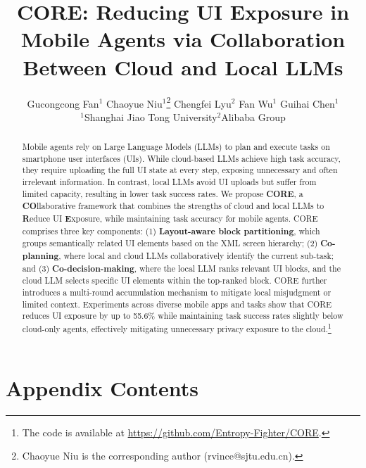\documentclass{article}
\title{CORE: Reducing UI Exposure in Mobile Agents via Collaboration Between Cloud and Local LLMs}
\author{
 Gucongcong Fan$^1$ \quad Chaoyue Niu$^1$\thanks{Chaoyue Niu is the corresponding author (rvince@sjtu.edu.cn).} \quad Chengfei Lyu$^2$ \quad Fan Wu$^1$ \quad Guihai Chen$^1$\\ 
 $^1$Shanghai Jiao Tong University\quad $^2$Alibaba Group
}
\begin{document}
\maketitle


\begin{abstract}
Mobile agents rely on Large Language Models (LLMs) to plan and execute tasks on smartphone user interfaces (UIs). While cloud-based LLMs achieve high task accuracy, they require uploading the full UI state at every step, exposing unnecessary and often irrelevant information. In contrast, local LLMs avoid UI uploads but suffer from limited capacity, resulting in lower task success rates. We propose \textbf{CORE}, a \textbf{CO}llaborative framework that combines the strengths of cloud and local LLMs to \textbf{R}educe UI \textbf{E}xposure, while maintaining task accuracy for mobile agents. CORE comprises three key components: (1) \textbf{Layout-aware block partitioning}, which groups semantically related UI elements based on the XML screen hierarchy; (2) \textbf{Co-planning}, where local and cloud LLMs collaboratively identify the current sub-task; and (3) \textbf{Co-decision-making}, where the local LLM ranks relevant UI blocks, and the cloud LLM selects specific UI elements within the top-ranked block. CORE further introduces a multi-round accumulation mechanism to mitigate local misjudgment or limited context. Experiments across diverse mobile apps and tasks show that CORE reduces UI exposure by up to 55.6\% while maintaining task success rates slightly below cloud-only agents, effectively mitigating unnecessary privacy exposure to the cloud.\footnote{The code is available at \url{https://github.com/Entropy-Fighter/CORE}.}
\end{abstract}








{}



\newpage
\appendix
\clearpage
\section*{Appendix Contents}
\startcontents[appendix]
\clearpage










\end{document}
